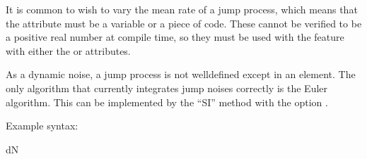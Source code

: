 \documentclass[letterpaper,10pt,english]{sphinxmanual}
\begin{document}
\sphinxAtStartPar
It is common to wish to vary the mean rate of a jump process, which means that the  attribute must be a variable or a piece of code.  These cannot be verified to be a positive real number at compile time, so they must be used with the {\hyperref[\detokenize{reference_elements:validation}]{}} feature with either the  or  attributes.

\sphinxAtStartPar
As a dynamic noise, a jump process is not well\sphinxhyphen{}defined except in an  element.  The only algorithm that currently integrates jump noises correctly is the Euler algorithm.  This can be implemented by the “SI” method with the option .

\sphinxAtStartPar
Example syntax:

\begin{sphinxVerbatim}[commandchars=\\\{\}]
 
           
      dN
\end{sphinxVerbatim}

\ignorespaces 
\end{document}

